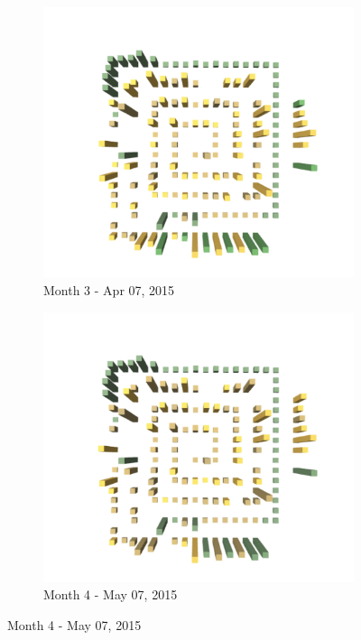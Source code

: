 \begin{figure}[ht]
    \medskip
    \begin{subfigure}{0.48\textwidth}
        \includegraphics[width=\linewidth]{JetUML_V1S3.png}
        \caption{Month 3 - Apr 07, 2015} \label{fig:JetUML_V1S3}
    \end{subfigure}\hspace*{\fill}
    \begin{subfigure}{0.48\textwidth}
    \includegraphics[width=\linewidth]{JetUML_V1S4.png}
    \caption{Month 4 - May 07, 2015} \label{fig:JetUML_V1S4}
    \end{subfigure}
    

\end{figure}
